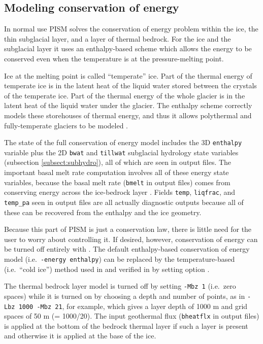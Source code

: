 \subsection{Modeling conservation of energy} \label{subsect:energy}

In normal use PISM solves the conservation of energy problem within the ice, the thin subglacial layer, and a layer of thermal bedrock.  For the ice and the subglacial layer it uses an enthalpy-based scheme \cite{AschwandenBuelerKhroulevBlatter} which allows the energy to be conserved even when the temperature is at the pressure-melting point.

Ice at the melting point is called ``temperate'' ice.  Part of the thermal energy of temperate ice is in the latent heat of the liquid water stored between the crystals of the temperate ice.  Part of the thermal energy of the whole glacier is in the latent heat of the liquid water under the glacier.  The enthalpy scheme correctly models these storehouses of thermal energy, and thus it allows polythermal and fully-temperate glaciers to be modeled \cite{AschwandenBlatter}.

The state of the full conservation of energy model includes the 3D \texttt{enthalpy} variable plus the 2D \texttt{bwat} and \texttt{tillwat} subglacial hydrology state variables (subsection \ref{subsect:subhydro}), all of which are seen in output files.  The important basal melt rate computation involves all of these energy state variables, because the basal melt rate (\texttt{bmelt} in output files) comes from conserving energy across the ice-bedrock layer \cite{AschwandenBuelerKhroulevBlatter}.  Fields \texttt{temp}, \texttt{liqfrac}, and \texttt{temp_pa} seen in output files are all actually diagnostic outputs because all of these can be recovered from the enthalpy and the ice geometry.

Because this part of PISM is just a conservation law, there is little need for the user to worry about controlling it.  If desired, however, conservation of energy can be turned off entirely with .  The default enthalpy-based conservation of energy model (i.e.~\texttt{-energy enthalpy}) can be replaced by the temperature-based (i.e.~``cold ice'') method used in \cite{BBssasliding} and verified in \cite{BBL} by setting option .

The thermal bedrock layer model is turned off by setting \texttt{-Mbz 1} (i.e.~zero spaces) while it is turned on by choosing a depth and number of points, as in \texttt{-Lbz 1000 -Mbz 21}, for example, which gives a layer depth of 1000 m and grid spaces of 50 m (= 1000/20).  The input geothermal flux (\texttt{bheatflx} in output files) is applied at the bottom of the bedrock thermal layer if such a layer is present and otherwise it is applied at the base of the ice.


